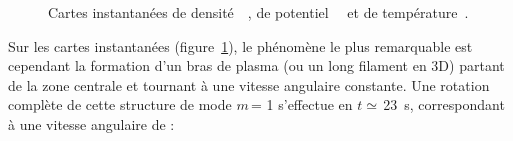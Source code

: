 \begin{refsection}
\begin{figure}[!htbp]
  \centering
    \caption{Cartes instantanées de densité~~,
    de potentiel~~ et de
    température~.}
    \label{CybeleCartesBase}
\end{figure}

 Sur les cartes instantanées 
 (figure~\ref{CybeleCartesBase}), le phénomène le plus remarquable est
 cependant la formation d'un bras de plasma (ou un long filament en 3D) partant
 de la zone centrale et tournant à une vitesse angulaire constante.
Une rotation complète de cette structure de mode $m\,$= 1 s'effectue en
$t\simeq\,$23~\micro s, correspondant à une vitesse angulaire de :


\end{refsection}
